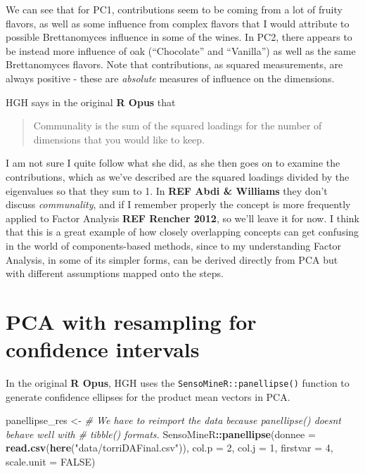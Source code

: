 \documentclass[
]{book}
\newenvironment{Shaded}{\begin{snugshade}}{\end{snugshade}}
\newcommand{\AttributeTok}[1]{\textcolor[rgb]{0.13,0.29,0.53}{#1}}
\newcommand{\CommentTok}[1]{\textcolor[rgb]{0.56,0.35,0.01}{\textit{#1}}}
\newcommand{\ConstantTok}[1]{\textcolor[rgb]{0.56,0.35,0.01}{#1}}
\newcommand{\DecValTok}[1]{\textcolor[rgb]{0.00,0.00,0.81}{#1}}
\newcommand{\FunctionTok}[1]{\textcolor[rgb]{0.13,0.29,0.53}{\textbf{#1}}}
\newcommand{\NormalTok}[1]{#1}
\newcommand{\OtherTok}[1]{\textcolor[rgb]{0.56,0.35,0.01}{#1}}
\newcommand{\SpecialCharTok}[1]{\textcolor[rgb]{0.81,0.36,0.00}{\textbf{#1}}}
\newcommand{\StringTok}[1]{\textcolor[rgb]{0.31,0.60,0.02}{#1}}
\begin{document}
We can see that for PC1, contributions seem to be coming from a lot of fruity flavors, as well as some influence from complex flavors that I would attribute to possible Brettanomyces influence in some of the wines. In PC2, there appears to be instead more influence of oak (``Chocolate'' and ``Vanilla'') as well as the same Brettanomyces flavors. Note that contributions, as squared measurements, are always positive - these are \emph{absolute} measures of influence on the dimensions.

HGH says in the original \textbf{R Opus} that

\begin{quote}
Communality is the sum of the squared loadings for the number of dimensions that you would like to keep.
\end{quote}

I am not sure I quite follow what she did, as she then goes on to examine the contributions, which as we've described are the squared loadings divided by the eigenvalues so that they sum to 1. In \textbf{REF Abdi \& Williams} they don't discuss \emph{communality}, and if I remember properly the concept is more frequently applied to Factor Analysis \textbf{REF Rencher 2012}, so we'll leave it for now. I think that this is a great example of how closely overlapping concepts can get confusing in the world of components-based methods, since to my understanding Factor Analysis, in some of its simpler forms, can be derived directly from PCA but with different assumptions mapped onto the steps.

\section{PCA with resampling for confidence intervals}\label{pca-with-resampling-for-confidence-intervals}

In the original \textbf{R Opus}, HGH uses the \texttt{SensoMineR::panellipse()} function to generate confidence ellipses for the product mean vectors in PCA.

\begin{Shaded}
\begin{Highlighting}[]
\NormalTok{panellipse\_res }\OtherTok{\textless{}{-}} 
  \CommentTok{\# We have to reimport the data because panellipse() doesn\textquotesingle{}t behave well with}
  \CommentTok{\# tibble() formats.}
\NormalTok{  SensoMineR}\SpecialCharTok{::}\FunctionTok{panellipse}\NormalTok{(}\AttributeTok{donnee =} \FunctionTok{read.csv}\NormalTok{(}\FunctionTok{here}\NormalTok{(}\StringTok{"data/torriDAFinal.csv"}\NormalTok{)), }
                         \AttributeTok{col.p =} \DecValTok{2}\NormalTok{, }\AttributeTok{col.j =} \DecValTok{1}\NormalTok{, }\AttributeTok{firstvar =} \DecValTok{4}\NormalTok{, }\AttributeTok{scale.unit =} \ConstantTok{FALSE}\NormalTok{)}
\end{Highlighting}
\end{Shaded}
\end{document}
